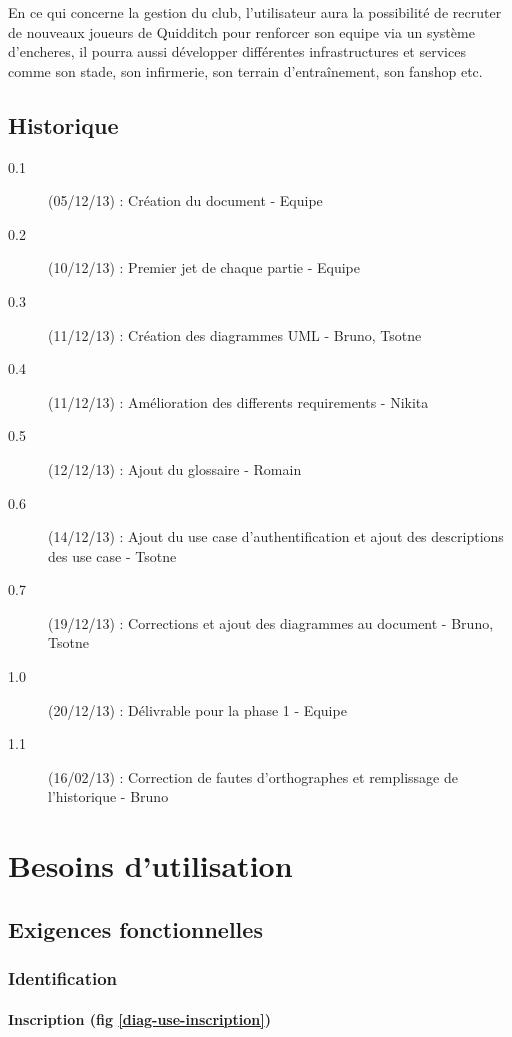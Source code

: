 \documentclass[a4paper]{article}
\begin{document}
En ce qui concerne la gestion du \gls{club}, l'\gls{utilisateur} aura la possibilité de recruter de nouveaux \glspl{joueur} de Quidditch pour renforcer son \gls{equipe} via un système d'\glspl{enchere}, il pourra aussi développer différentes infrastructures et services comme son stade, son infirmerie, son terrain d'entraînement, son fanshop etc.


\printglossary[numberedsection]
\subsection{Historique}
\begin{description}
\item[0.1] (05/12/13) : Création du document - Equipe
\item[0.2] (10/12/13) : Premier jet de chaque partie - Equipe
\item[0.3] (11/12/13) : Création des diagrammes UML - Bruno, Tsotne
\item[0.4] (11/12/13) : Amélioration des differents requirements - Nikita
\item[0.5] (12/12/13) : Ajout du glossaire - Romain
\item[0.6] (14/12/13) : Ajout du use case d'authentification et ajout des descriptions des use case - Tsotne
\item[0.7] (19/12/13) : Corrections et ajout des diagrammes au document - Bruno, Tsotne
\item[1.0] (20/12/13) : Délivrable pour la phase 1 - Equipe
\item[1.1] (16/02/13) : Correction de fautes d'orthographes et remplissage de l'historique - Bruno
\end{description}


\section{Besoins d'utilisation}
\subsection{Exigences fonctionnelles}

\subsubsection{Identification}

\paragraph{Inscription (fig \ref{diag-use-inscription})}
\end{document}
